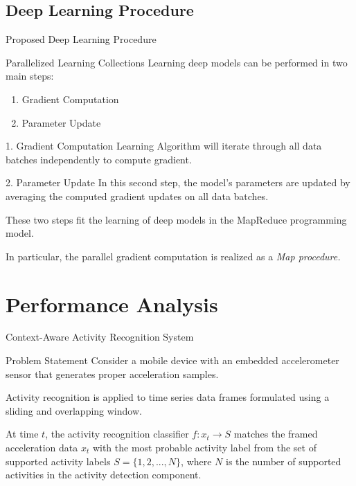 \documentclass[newPxFont]{beamer}
\begin{document}
\subsection{Deep Learning Procedure}
\begin{frame}[allowframebreaks]{Proposed Deep Learning Procedure}
	\begin{block}{Parallelized Learning Collections}
    	Learning deep models can be performed in two main steps:
        	\begin{enumerate}
            	\item{Gradient Computation}
                \item{Parameter Update}
            \end{enumerate}
    \end{block}
    
    \begin{exampleblock}{1. Gradient Computation}
    	Learning Algorithm will iterate through all data batches independently to compute gradient. 
    \end{exampleblock}
    
    \framebreak 
    
    \begin{exampleblock}{2. Parameter Update}
    	In this second step, the model's parameters are updated by averaging the computed gradient updates on all data batches.
    \end{exampleblock}
    
    These two steps fit the learning of deep models in the MapReduce programming model.
 
    \vspace{0.5em}
    
    In particular, the parallel gradient computation is realized as a \textit{Map procedure.}
    
    
\end{frame}

\section{Performance Analysis}
\begin{frame}{Context-Aware Activity Recognition System }
	\begin{block}{Problem Statement}
    	Consider a mobile device with an embedded accelerometer
sensor that generates proper acceleration samples. 

Activity recognition is applied to time series data frames formulated using a sliding and overlapping window.
	
    At time $t$, the activity recognition classifier $f:x_{t}\to S$ matches the framed acceleration data $x_{t}$ with the most probable activity label from the set of supported activity labels $S = \{1, 2, ..., N\}$, where $N$ is the number of supported activities in the activity detection component.
    

    \end{block}
\end{frame}
\end{document}
